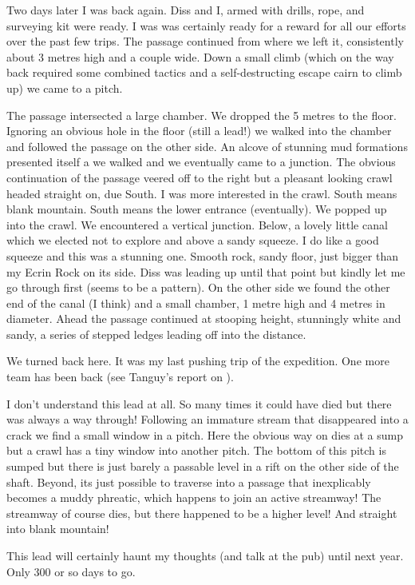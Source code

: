 Two days later I was back again. Diss and I, armed with drills, rope, and surveying kit were ready. I was was certainly ready for a reward for all our efforts over the past few trips. The passage continued from where we left it, consistently about 3 metres high and a couple wide. Down a small climb (which on the way back required some combined tactics and a self-destructing escape cairn to climb up) we came to a pitch.
 \begin{marginfigure}
\end{marginfigure}  
The passage intersected a large chamber. We dropped the 5 metres to the floor. Ignoring an obvious hole in the floor (still a lead!) we walked into the chamber and followed the passage on the other side. An alcove of stunning mud formations presented itself a we walked and we eventually came to a junction. The obvious continuation of the passage veered off to the right but a pleasant looking crawl headed straight on, due South. I was more interested in the crawl. South means blank mountain. South means the lower entrance (eventually). 
We popped up into the crawl. We encountered a vertical junction. Below, a lovely little canal which we elected not to explore and above a sandy squeeze. I do like a good squeeze and this was a stunning one. Smooth rock, sandy floor, just bigger than my Ecrin Rock on its side. Diss was leading up until that point but kindly let me go through first (seems to be a pattern). On the other side we found the other end of the canal (I think) and a small chamber, 1 metre high and 4 metres in diameter. Ahead the passage continued at stooping height, stunningly white and sandy, a series of stepped ledges leading off into the distance.
 
We turned back here. It was my last pushing trip of the expedition. One more team has been back (see Tanguy’s report on ).
 
I don’t understand this lead at all. So many times it could have died but there was always a way through! Following an immature stream that disappeared into a crack we find a small window in a pitch. Here the obvious way on dies at a sump but a crawl has a tiny window into another pitch. The bottom of this pitch is sumped but there is just barely a passable level in a rift on the other side of the shaft. Beyond, its just possible to traverse into a passage that inexplicably becomes a muddy phreatic, which happens to join an active streamway! The streamway of course dies, but there happened to be a higher level! And straight into blank mountain!
 
This lead will certainly haunt my thoughts (and talk at the pub) until next year. Only 300 or so days to go.

